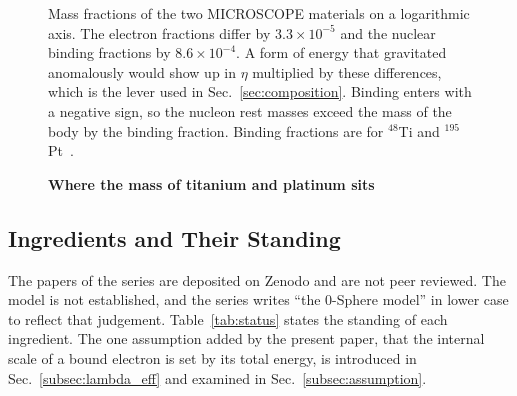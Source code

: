 \documentclass[%
 reprint, amsmath,amssymb, aps, prb, ]{revtex4-2}
\numberwithin{equation}{section}
\begin{document}
\begin{figure}[t!]
\centering
{}
\caption{\textbf{Where the mass of titanium and platinum sits}}
\label{fig:budget}
\vspace{0.4em}
\begin{minipage}{0.95\columnwidth}
\justifying\small
Mass fractions of the two MICROSCOPE materials on a logarithmic axis. The electron fractions differ by $3.3\times10^{-5}$ and the nuclear binding fractions by $8.6\times10^{-4}$. A form of energy that gravitated anomalously would show up in $\eta$ multiplied by these differences, which is the lever used in Sec.~\ref{sec:composition}. Binding enters with a negative sign, so the nucleon rest masses exceed the mass of the body by the binding fraction. Binding fractions are for $^{48}$Ti and $^{195}$Pt~\cite{ame2020}.
\end{minipage}
\end{figure}

\subsection{Ingredients and Their Standing}
\label{subsec:primer_status}

The papers of the series are deposited on Zenodo and are not peer reviewed. The model is not established, and the series writes ``the 0-Sphere model'' in lower case to reflect that judgement. Table~\ref{tab:status} states the standing of each ingredient. The one assumption added by the present paper, that the internal scale of a bound electron is set by its total energy, is introduced in Sec.~\ref{subsec:lambda_eff} and examined in Sec.~\ref{subsec:assumption}.
\end{document}
